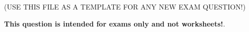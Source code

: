 

(USE THIS FILE AS A TEMPLATE FOR ANY NEW EXAM QUESTION!)














{\bf This question is intended for exams only and not worksheets!}.


